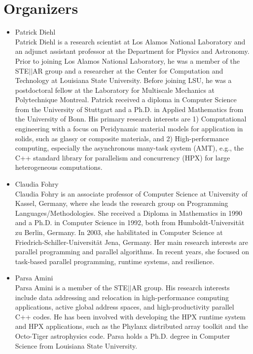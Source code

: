 \documentclass{article}
\begin{document}
\section*{Organizers} 
\begin{itemize}
\item Patrick Diehl \\
Patrick Diehl is a research scientist at Los Alamos National Laboratory and an adjunct assistant professor at the Department for Physics and Astronomy. Prior to joining Los Alamos National Laboratory, he was a member of the STE$\vert\vert$AR group and a researcher at the Center for Computation and Technology at Louisiana State University. Before joining LSU, he was a postdoctoral fellow at the Laboratory for Multiscale Mechanics at Polytechnique Montreal. Patrick received a diploma in Computer Science from the University of Stuttgart and a Ph.D. in Applied Mathematics from the University of Bonn. His primary research interests are 1) Computational engineering with a focus on Peridynamic material models for application in solids, such as glassy or composite materials, and 2) High-performance computing, especially the asynchronous many-task system (AMT), e.g., the C++ standard library for parallelism and concurrency (HPX) for large heterogeneous computations.
\item Claudia Fohry\\
Claudia Fohry is an associate professor of Computer Science at
University of Kassel, Germany, where she leads the research group on
Programming Languages/Methodologies. She received a Diploma in
Mathematics in 1990 and a Ph.D. in Computer Science in
1992, both from Humboldt-Universität zu Berlin, Germany. In 2003, she
habilitated in Computer Science at Friedrich-Schiller-Universität
Jena, Germany. Her main research interests are parallel programming and
parallel algorithms. In recent years, she focused on task-based parallel
programming, runtime systems, and resilience.
\item Parsa Amini \\
Parsa Amini is a member of the STE$\vert\vert$AR group. His research interests include data addressing and relocation in high-performance computing applications, active global address spaces, and high-productivity parallel C++ codes. He has been involved with developing the HPX runtime system and HPX applications, such as the Phylanx distributed array toolkit and the Octo-Tiger astrophysics code. Parsa holds a Ph.D. degree in Computer Science from Louisiana State University.
\end{itemize}
\end{document}
